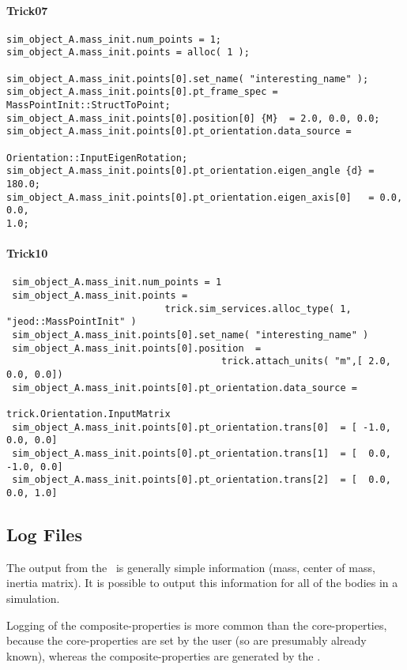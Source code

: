 \paragraph{Trick07}
\begin{verbatim}
sim_object_A.mass_init.num_points = 1;
sim_object_A.mass_init.points = alloc( 1 );

sim_object_A.mass_init.points[0].set_name( "interesting_name" );
sim_object_A.mass_init.points[0].pt_frame_spec =
MassPointInit::StructToPoint;
sim_object_A.mass_init.points[0].position[0] {M}  = 2.0, 0.0, 0.0;
sim_object_A.mass_init.points[0].pt_orientation.data_source =
                                               Orientation::InputEigenRotation;
sim_object_A.mass_init.points[0].pt_orientation.eigen_angle {d} = 180.0;
sim_object_A.mass_init.points[0].pt_orientation.eigen_axis[0]   = 0.0, 0.0,
1.0;
\end{verbatim}

\paragraph{Trick10}
\begin{verbatim}
 sim_object_A.mass_init.num_points = 1
 sim_object_A.mass_init.points =
                            trick.sim_services.alloc_type( 1, "jeod::MassPointInit" )
 sim_object_A.mass_init.points[0].set_name( "interesting_name" )
 sim_object_A.mass_init.points[0].position  =
                                      trick.attach_units( "m",[ 2.0, 0.0, 0.0])
 sim_object_A.mass_init.points[0].pt_orientation.data_source =
                                                  trick.Orientation.InputMatrix
 sim_object_A.mass_init.points[0].pt_orientation.trans[0]  = [ -1.0,  0.0, 0.0]
 sim_object_A.mass_init.points[0].pt_orientation.trans[1]  = [  0.0, -1.0, 0.0]
 sim_object_A.mass_init.points[0].pt_orientation.trans[2]  = [  0.0,  0.0, 1.0]

\end{verbatim}


\subsection{Log Files}
The output from the \ModelDesc\ is generally simple information (mass, center
of
mass, inertia matrix).  It is possible to output this information for all of
the bodies in a simulation.

Logging of the composite-properties is more common than the core-properties,
because the core-properties are set by the user (so are presumably already
known), whereas the composite-properties are generated by the \ModelDesc.


